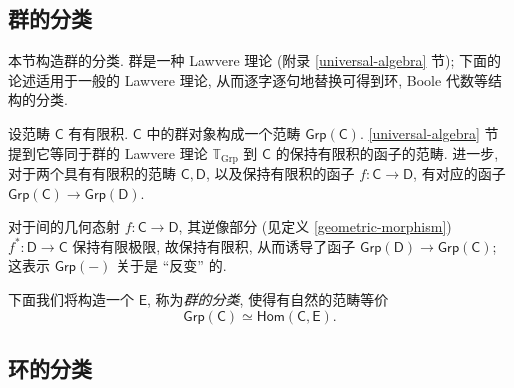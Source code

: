 \todo{}

\subsection{群的分类\topos{}}

本节构造群的分类\topos{}. 群是一种 Lawvere 理论 (附录 \ref{universal-algebra} 节); 下面的论述适用于一般的 Lawvere 理论, 从而逐字逐句地替换可得到环, Boole 代数等结构的分类\topos{}.
%


设范畴 $\mathsf C$ 有有限积. $\mathsf C$ 中的群对象构成一个范畴 $\mathsf {Grp}(\mathsf C)$.
\ref{universal-algebra} 节提到它等同于群的 Lawvere 理论 $\mathbb T_{\text{Grp}}$ 到 $\mathsf C$ 的保持有限积的函子的范畴.
进一步, 对于两个具有有限积的范畴 $\mathsf C,\mathsf D$, 以及保持有限积的函子 $f \colon \mathsf C \to \mathsf D$, 有对应的函子
$\mathsf {Grp}(\mathsf C) \to \mathsf {Grp}(\mathsf D)$.%

对于\topos{}间的几何态射 $f \colon \mathsf C \to \mathsf D$, 其逆像部分 (见定义 \ref{geometric-morphism}) $f^* \colon \mathsf D \to \mathsf C$ 保持有限极限, 故保持有限积, 从而诱导了函子 $\mathsf {Grp}(\mathsf D) \to \mathsf {Grp}(\mathsf C)$;
这表示 $\mathsf {Grp}(-)$ 关于\topos{}是 ``反变'' 的.

下面我们将构造一个\topos{} $\mathsf E$, 称为\emph{群的分类\topos{}}, 使得有自然的范畴等价
$$
\mathsf {Grp}(\mathsf C) \simeq \mathsf{Hom}(\mathsf C,\mathsf E).
$$

\subsection{环的分类\topos{}}

